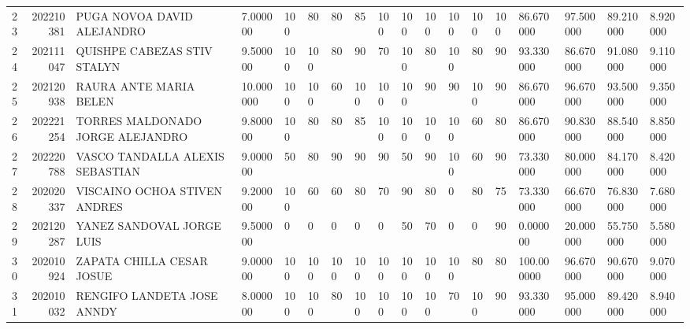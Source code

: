 \documentclass{article}
\begin{document}
\begin{table}
\begin{tabularx}{\textwidth}{lrp{}XXXXXXXXXXXXXXX}
23 & 202210381 & PUGA NOVOA DAVID ALEJANDRO & 7.000000 & 100 & 80 & 80 & 85 & 100 & 100 & 100 & 100 & 100 & 100 & 86.670000 & 97.500000 & 89.210000 & 8.920000 \\
24 & 202111047 & QUISHPE CABEZAS STIV STALYN & 9.500000 & 100 & 100 & 80 & 90 & 70 & 100 & 80 & 100 & 80 & 90 & 93.330000 & 86.670000 & 91.080000 & 9.110000 \\
25 & 202120938 & RAURA ANTE MARIA BELEN & 10.000000 & 100 & 100 & 60 & 100 & 100 & 100 & 90 & 90 & 100 & 90 & 86.670000 & 96.670000 & 93.500000 & 9.350000 \\
26 & 202221254 & TORRES MALDONADO JORGE ALEJANDRO & 9.800000 & 100 & 80 & 80 & 85 & 100 & 100 & 100 & 100 & 60 & 80 & 86.670000 & 90.830000 & 88.540000 & 8.850000 \\
27 & 202220788 & VASCO TANDALLA ALEXIS SEBASTIAN & 9.000000 & 50 & 80 & 90 & 90 & 90 & 50 & 90 & 100 & 60 & 90 & 73.330000 & 80.000000 & 84.170000 & 8.420000 \\
28 & 202020337 & VISCAINO OCHOA STIVEN ANDRES & 9.200000 & 100 & 60 & 60 & 80 & 70 & 90 & 80 & 0 & 80 & 75 & 73.330000 & 66.670000 & 76.830000 & 7.680000 \\
29 & 202120287 & YANEZ SANDOVAL JORGE LUIS & 9.500000 & 0 & 0 & 0 & 0 & 0 & 50 & 70 & 0 & 0 & 90 & 0.000000 & 20.000000 & 55.750000 & 5.580000 \\
30 & 202010924 & ZAPATA CHILLA CESAR JOSUE & 9.000000 & 100 & 100 & 100 & 100 & 100 & 100 & 100 & 100 & 80 & 80 & 100.000000 & 96.670000 & 90.670000 & 9.070000 \\
31 & 202010032 & RENGIFO LANDETA JOSE ANNDY & 8.000000 & 100 & 100 & 80 & 100 & 100 & 100 & 100 & 70 & 100 & 90 & 93.330000 & 95.000000 & 89.420000 & 8.940000 \\
\bottomrule
\end{tabularx}

\end{table}
\end{document}
